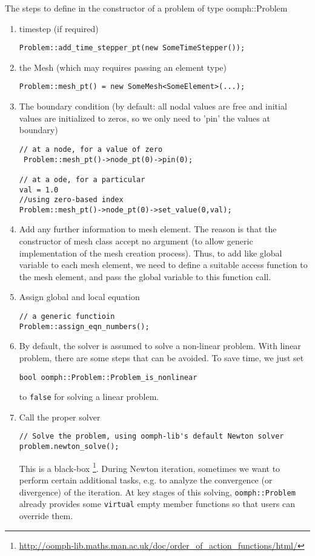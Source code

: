 The steps to define in the constructor of a problem of type oomph::Problem
\begin{enumerate}
  \item timestep (if required)
\begin{verbatim}
Problem::add_time_stepper_pt(new SomeTimeStepper());
\end{verbatim}  

  \item the Mesh (which may requires passing an element type)
\begin{verbatim}
Problem::mesh_pt() = new SomeMesh<SomeElement>(...); 
\end{verbatim}  

  \item The boundary condition (by default: all nodal values are free and
  initial values are initialized to zeros, so we only need to 'pin' the values
  at boundary)
\begin{verbatim}
// at a node, for a value of zero
 Problem::mesh_pt()->node_pt(0)->pin(0); 
 
// at a ode, for a particular
val = 1.0
//using zero-based index
Problem::mesh_pt()->node_pt(0)->set_value(0,val); 
\end{verbatim}
  
  \item Add any further information to mesh element. The reason is that the
  constructor of mesh class accept no argument (to allow generic implementation
  of the mesh creation process). Thus, to add like global variable to each mesh
  element, we need to define a suitable access function to the mesh element, and
  pass the global variable to this function call.
  
  \item Assign global and local equation
\begin{verbatim}
// a generic functioin
Problem::assign_eqn_numbers(); 
\end{verbatim}  

  \item By default, the solver is assumed to solve a non-linear problem. With
  linear problem, there are some steps that can be avoided. To save time, we
  just set
\begin{verbatim}
bool oomph::Problem::Problem_is_nonlinear
\end{verbatim}  
to \verb!false! for solving a linear problem.

  \item Call the proper solver
\begin{verbatim}
// Solve the problem, using oomph-lib's default Newton solver
problem.newton_solve();
\end{verbatim}  
This is a black-box
\footnote{\url{http://oomph-lib.maths.man.ac.uk/doc/order_of_action_functions/html/}}.
During Newton iteration, sometimes we want to perform certain additional tasks,
e.g. to analyze the convergence (or divergence) of the iteration. At key stages
of this solving, \verb!oomph::Problem! already provides some \verb!virtual!
empty member functions so that users can override them.


\end{enumerate}
